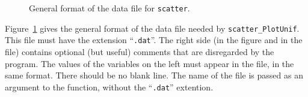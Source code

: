 \begin{figure}
\begin{center}
\end{center}
\caption { General format of the data file for {\tt scatter}.}
\label{formatdon}
\end{figure}


Figure~\ref{formatdon} gives the general format of the data file
needed by {\tt scatter\_PlotUnif}.
This file must have the extension ``{\tt .dat}''.
The right side (in the figure and in the file) contains optional
(but useful) comments that are disregarded by the program.
The values of the variables on the left must appear in the file,
in the same format.
There should be no blank line.
The name of the file is passed as an argument to the function,
without the ``{\tt .dat}'' extention.


